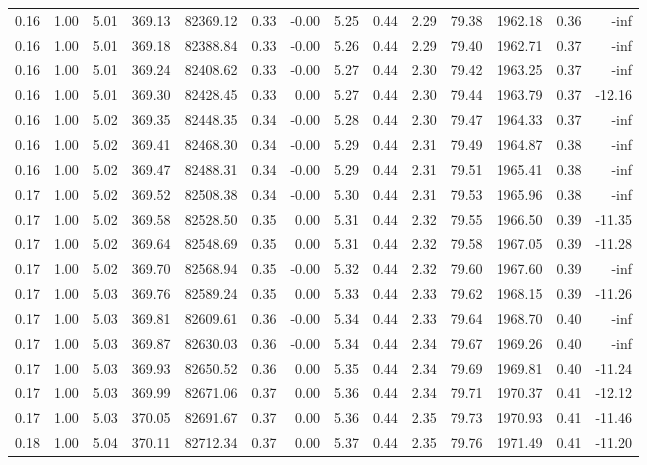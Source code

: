 \begin{table}[!ht]
\begin{tabular}{rrrrrrrrrrrrrr}
0.16 & 1.00 & 5.01 & 369.13 & 82369.12 & 0.33 & -0.00 & 5.25 & 0.44 & 2.29 & 79.38 & 1962.18 & 0.36 & -inf \\
0.16 & 1.00 & 5.01 & 369.18 & 82388.84 & 0.33 & -0.00 & 5.26 & 0.44 & 2.29 & 79.40 & 1962.71 & 0.37 & -inf \\
0.16 & 1.00 & 5.01 & 369.24 & 82408.62 & 0.33 & -0.00 & 5.27 & 0.44 & 2.30 & 79.42 & 1963.25 & 0.37 & -inf \\
0.16 & 1.00 & 5.01 & 369.30 & 82428.45 & 0.33 & 0.00 & 5.27 & 0.44 & 2.30 & 79.44 & 1963.79 & 0.37 & -12.16 \\
0.16 & 1.00 & 5.02 & 369.35 & 82448.35 & 0.34 & -0.00 & 5.28 & 0.44 & 2.30 & 79.47 & 1964.33 & 0.37 & -inf \\
0.16 & 1.00 & 5.02 & 369.41 & 82468.30 & 0.34 & -0.00 & 5.29 & 0.44 & 2.31 & 79.49 & 1964.87 & 0.38 & -inf \\
0.16 & 1.00 & 5.02 & 369.47 & 82488.31 & 0.34 & -0.00 & 5.29 & 0.44 & 2.31 & 79.51 & 1965.41 & 0.38 & -inf \\
0.17 & 1.00 & 5.02 & 369.52 & 82508.38 & 0.34 & -0.00 & 5.30 & 0.44 & 2.31 & 79.53 & 1965.96 & 0.38 & -inf \\
0.17 & 1.00 & 5.02 & 369.58 & 82528.50 & 0.35 & 0.00 & 5.31 & 0.44 & 2.32 & 79.55 & 1966.50 & 0.39 & -11.35 \\
0.17 & 1.00 & 5.02 & 369.64 & 82548.69 & 0.35 & 0.00 & 5.31 & 0.44 & 2.32 & 79.58 & 1967.05 & 0.39 & -11.28 \\
0.17 & 1.00 & 5.02 & 369.70 & 82568.94 & 0.35 & -0.00 & 5.32 & 0.44 & 2.32 & 79.60 & 1967.60 & 0.39 & -inf \\
0.17 & 1.00 & 5.03 & 369.76 & 82589.24 & 0.35 & 0.00 & 5.33 & 0.44 & 2.33 & 79.62 & 1968.15 & 0.39 & -11.26 \\
0.17 & 1.00 & 5.03 & 369.81 & 82609.61 & 0.36 & -0.00 & 5.34 & 0.44 & 2.33 & 79.64 & 1968.70 & 0.40 & -inf \\
0.17 & 1.00 & 5.03 & 369.87 & 82630.03 & 0.36 & -0.00 & 5.34 & 0.44 & 2.34 & 79.67 & 1969.26 & 0.40 & -inf \\
0.17 & 1.00 & 5.03 & 369.93 & 82650.52 & 0.36 & 0.00 & 5.35 & 0.44 & 2.34 & 79.69 & 1969.81 & 0.40 & -11.24 \\
0.17 & 1.00 & 5.03 & 369.99 & 82671.06 & 0.37 & 0.00 & 5.36 & 0.44 & 2.34 & 79.71 & 1970.37 & 0.41 & -12.12 \\
0.17 & 1.00 & 5.03 & 370.05 & 82691.67 & 0.37 & 0.00 & 5.36 & 0.44 & 2.35 & 79.73 & 1970.93 & 0.41 & -11.46 \\
0.18 & 1.00 & 5.04 & 370.11 & 82712.34 & 0.37 & 0.00 & 5.37 & 0.44 & 2.35 & 79.76 & 1971.49 & 0.41 & -11.20 \\

\end{tabular}
\end{table}
